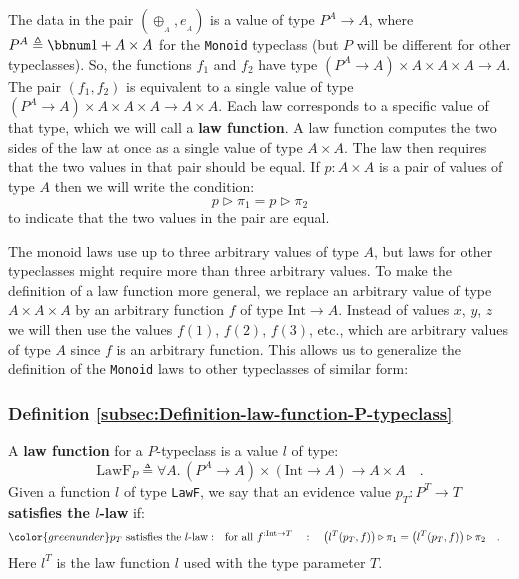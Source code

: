 The data in the pair $(\oplus_{_{A}},e_{_{A}})$ is a value of type
$P^{A}\rightarrow A$, where $P^{A}\triangleq\bbnum 1+A\times A$
for the \lstinline!Monoid!
typeclass (but $P$ will be different for other typeclasses). So,
the functions $f_{1}$ and $f_{2}$ have type $(P^{A}\rightarrow A)\times A\times A\times A\rightarrow A$.
The pair $(f_{1},f_{2})$ is equivalent to a single value of type
$(P^{A}\rightarrow A)\times A\times A\times A\rightarrow A\times A$.
Each law corresponds to a specific value of that type, which we will
call a \textbf{law function}. A law function
computes the two sides of the law at once as a single value of type
$A\times A$. The law then requires that the two values in that pair
should be equal. If $p:A\times A$ is a pair of values of type $A$
then we will write the condition: 
\[
p\triangleright\pi_{1}=p\triangleright\pi_{2}
\]
to indicate that the two values in the pair are equal.

The monoid laws use up to three arbitrary values of type $A$, but
laws for other typeclasses might require more than three arbitrary
values. To make the definition of a law function more general, we
replace an arbitrary value of type $A\times A\times A$ by an arbitrary
function $f$ of type $\text{Int}\rightarrow A$. Instead of values
$x$, $y$, $z$ we will then use the values $f(1)$, $f(2)$, $f(3)$,
etc., which are arbitrary values of type $A$ since $f$ is an arbitrary
function. This allows us to generalize the definition of the \lstinline!Monoid!
laws to other typeclasses of similar form:

\subsubsection{Definition \label{subsec:Definition-law-function-P-typeclass}\ref{subsec:Definition-law-function-P-typeclass}}

A \textbf{law function} for a $P$-typeclass 
 is a value $l$ of type:
\begin{equation}
\text{LawF}_{P}\triangleq\forall A.\,(P^{A}\rightarrow A)\times(\text{Int}\rightarrow A)\rightarrow A\times A\quad.\label{eq:P-typeclass-law-type}
\end{equation}
Given a function $l$ of type \lstinline!LawF!,
we say that an evidence value $p_{T}:P^{T}\rightarrow T$ \textbf{satisfies
the $l$-law} if:
\begin{align}
{\color{greenunder}p_{T}\text{ satisfies the }l\text{-law}:}\quad & \text{for all }f^{:\text{Int}\rightarrow T}\quad:\quad\big(l^{T}(p_{T},f)\big)\triangleright\pi_{1}=\big(l^{T}(p_{T},f)\big)\triangleright\pi_{2}\quad.\label{eq:P-typeclass-law}
\end{align}
Here $l^{T}$ is the law function $l$ used with the type parameter
$T$.

